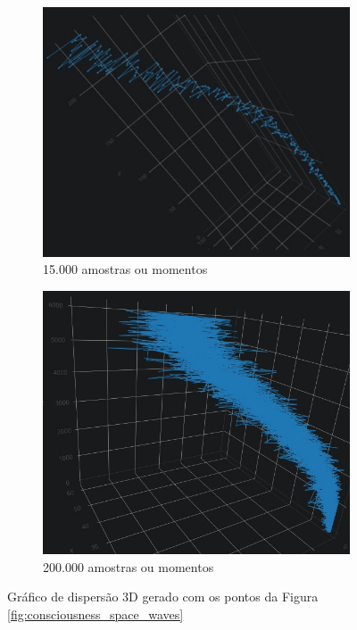 	\begin{figure}[H]
	\centering
		\begin{subfigure}[H]{0.47\linewidth}
		\centering
		\includegraphics[width=.96\linewidth]{sections/images/consciousness_space_3DScatter15000-10.jpg}
		\caption{15.000 amostras ou momentos}
		\label{fig:consciousness_space_3DScatter15000-10}
		\end{subfigure}
	\hfill
		\begin{subfigure}[H]{0.47\linewidth}
		\centering
		\includegraphics[width=.9\linewidth]{sections/images/consciousness_space_3DScatter_200000-2.jpg}
		\caption{200.000 amostras ou momentos}
		\label{fig:consciousness_space_3DScatter_200000-2}
		\end{subfigure}%
	\caption{Gráfico de dispersão 3D gerado com os pontos da Figura \ref{fig:consciousness_space_waves}}
	\end{figure}

